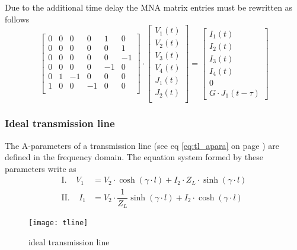 Due to the additional time delay the MNA matrix entries must be
rewritten as follows
\begin{equation}
\begin{bmatrix}
0 & 0 & 0 & 0 & 1 & 0\\
0 & 0 & 0 & 0 & 0 & 1\\
0 & 0 & 0 & 0 & 0 & -1\\
0 & 0 & 0 & 0 & -1 & 0\\
0 & 1 & -1 & 0 & 0 & 0\\
1 & 0 & 0 & -1 & 0 & 0\\
\end{bmatrix}
\cdot
\begin{bmatrix}
V_1\left(t\right)\\
V_2\left(t\right)\\
V_3\left(t\right)\\
V_4\left(t\right)\\
J_1\left(t\right)\\
J_2\left(t\right)\\
\end{bmatrix}
=
\begin{bmatrix}
I_1\left(t\right)\\
I_2\left(t\right)\\
I_3\left(t\right)\\
I_4\left(t\right)\\
0\\
G\cdot J_1\left(t - \tau\right)
\end{bmatrix}
\end{equation}

\subsubsection{Ideal transmission line}

The A-parameters of a transmission line (see eq \eqref{eq:tl_apara} on
page \pageref{eq:tl_apara}) are defined in the frequency domain.  The
equation system formed by these parameters write as
\begin{align}
\textrm{I.}\;\;\;\;V_1 &= V_2\cdot\cosh{\left(\gamma\cdot l\right)} + I_2\cdot Z_L\cdot\sinh{\left(\gamma\cdot l\right)}\\
\textrm{II.}\;\;\;\;I_1 &= V_2\cdot\dfrac{1}{Z_L}\sinh{\left(\gamma\cdot l\right)} + I_2\cdot \cosh{\left(\gamma\cdot l\right)}
\end{align}

\begin{figure}[ht]
\begin{center}
\texttt{[image: tline]}
\end{center}
\label{fig:TransLine}
\caption{ideal transmission line}
\end{figure}
\FloatBarrier

